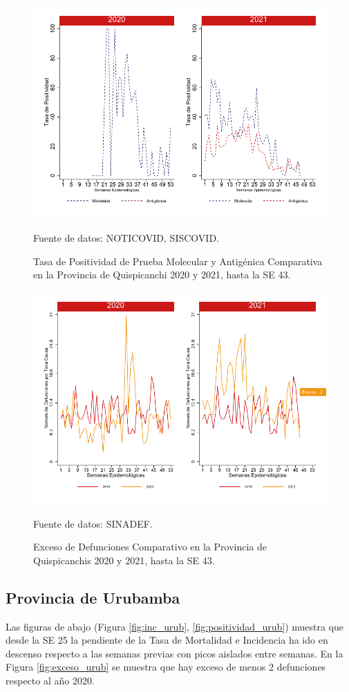 \documentclass[12pt,a4paper,openany]{book}
\begin{document}
		\begin{figure}[h]
			\caption{Tasa de Positividad de Prueba Molecular y Antigénica Comparativa en la Provincia de Quispicanchi 2020 y 2021, hasta la SE 43.}\label{fig:positividad_quisp}
			\begin{center}
				\includegraphics[width=0.7\linewidth]{../figuras/positividad_20_21_12}
			\end{center}
			{\footnotesize {Fuente de datos: NOTICOVID, SISCOVID.}}
		\end{figure}
		
		\begin{figure}[h]
			\caption{Exceso de Defunciones Comparativo en la Provincia de Quispicanchis 2020 y 2021, hasta la SE 43.}\label{fig:exceso_quisp}
			\begin{center}
				\includegraphics[width=0.7\linewidth]{../figuras/exceso_12}
			\end{center}
			{\footnotesize {Fuente de datos: SINADEF.}}
		\end{figure}
		
		\clearpage
		
		\subsection*{Provincia de Urubamba}
		\noindent Las figuras de abajo (Figura \ref{fig:inc_urub}, \ref{fig:positividad_urub}) muestra que desde la SE 25 la pendiente de la Tasa de Mortalidad e Incidencia ha ido en descenso respecto a las semanas previas con picos aislados entre semanas. En la Figura \ref{fig:exceso_urub} se muestra que hay exceso de menos 2 defunciones respecto al año 2020.
		
\end{document}
